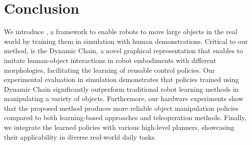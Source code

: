 \section{Conclusion} 
\label{sec:conclusion}

We introduce \method, a framework to enable robots to move large objects in the real world by training them in simulation with human demonstrations. Critical to our method, is the Dynamic Chain, a novel graphical representation that enables to imitate human-object interactions in robot embodiments with different morphologies, facilitating the learning of reusable control policies. Our experimental evaluation in simulation demonstrates that policies trained using Dynamic Chain significantly outperform traditional robot learning methods in manipulating a variety of objects. Furthermore, our hardware experiments show that the proposed method produces more reliable object manipulation policies compared to both learning-based approaches and teleoperation methods. Finally, we integrate the learned policies with various high-level planners, showcasing their applicability in diverse real-world daily tasks.


